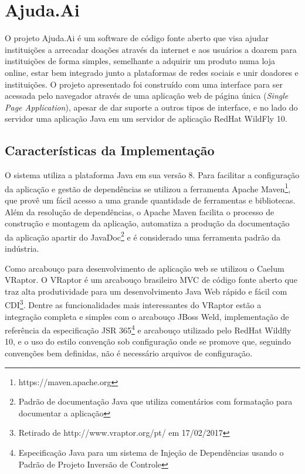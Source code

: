 \chapter{Ajuda.Ai} \label{cha:ajudaai}

O projeto Ajuda.Ai é um software de código fonte aberto que visa ajudar instituições a arrecadar doações através da internet e aos usuários a doarem para instituições de forma simples, semelhante a adquirir um produto numa loja online, estar bem integrado junto a plataformas de redes sociais e unir doadores e instituições. O projeto apresentado foi construído com uma interface para ser acessada pelo navegador através de uma aplicação web de página única (\emph{Single Page Application}), apesar de dar suporte a outros tipos de interface, e no lado do servidor uma aplicação Java em um servidor de aplicação RedHat WildFly 10.





\section{Características da Implementação} \label{sec:ajudaai:impl}

O sistema utiliza a plataforma Java em sua versão 8. Para facilitar a configuração da aplicação e gestão de dependências se utilizou a ferramenta Apache Maven\footnote{https://maven.apache.org}, que provê um fácil acesso a uma grande quantidade de ferramentas e bibliotecas. Além da resolução de dependências, o Apache Maven facilita o processo de construção e montagem da aplicação, automatiza a produção da documentação da aplicação apartir do JavaDoc\footnote{Padrão de documentação Java que utiliza comentários com formatação para documentar a aplicação} e é considerado uma ferramenta padrão da indústria.

Como arcabouço para desenvolvimento de aplicação web se utilizou o Caelum VRaptor. O VRaptor é um arcabouço brasileiro MVC de código fonte aberto que traz alta produtividade para um desenvolvimento Java Web rápido e fácil com CDI\footnote{Retirado de http://www.vraptor.org/pt/ em 17/02/2017}. Dentre as funcionalidades mais interessantes do VRaptor estão a integração completa e simples com o arcabouço JBoss Weld, implementação de referência da especificação JSR 365\footnote{Especificação Java para um sistema de Injeção de Dependências usando o Padrão de Projeto Inversão de Controle} e arcabouço utilizado pelo RedHat Wildfly 10, e o uso do estilo convenção sob configuração onde se promove que, seguindo convenções bem definidas, não é necessário arquivos de configuração.


